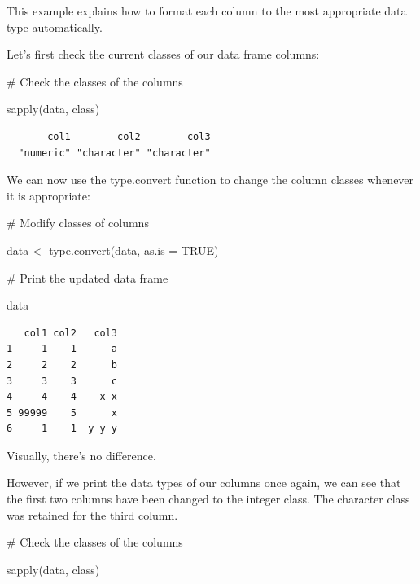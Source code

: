 \documentclass[
  letterpaper,
  DIV=11,
  numbers=noendperiod]{scrreprt}
\newenvironment{Shaded}{\begin{snugshade}}{\end{snugshade}}
\newcommand{\AttributeTok}[1]{\textcolor[rgb]{0.40,0.45,0.13}{#1}}
\newcommand{\CommentTok}[1]{\textcolor[rgb]{0.37,0.37,0.37}{#1}}
\newcommand{\ConstantTok}[1]{\textcolor[rgb]{0.56,0.35,0.01}{#1}}
\newcommand{\FunctionTok}[1]{\textcolor[rgb]{0.28,0.35,0.67}{#1}}
\newcommand{\NormalTok}[1]{\textcolor[rgb]{0.00,0.23,0.31}{#1}}
\newcommand{\OtherTok}[1]{\textcolor[rgb]{0.00,0.23,0.31}{#1}}
\begin{document}
This example explains how to format each column to the most appropriate
data type automatically.

Let's first check the current classes of our data frame columns:

\begin{Shaded}
\begin{Highlighting}[]
\CommentTok{\# Check the classes of the columns}

\FunctionTok{sapply}\NormalTok{(data, class)}
\end{Highlighting}
\end{Shaded}

\begin{verbatim}
       col1        col2        col3 
  "numeric" "character" "character" 
\end{verbatim}

We can now use the type.convert function to change the column classes
whenever it is appropriate:

\begin{Shaded}
\begin{Highlighting}[]
\CommentTok{\# Modify classes of columns}

\NormalTok{data }\OtherTok{\textless{}{-}} \FunctionTok{type.convert}\NormalTok{(data, }\AttributeTok{as.is =} \ConstantTok{TRUE}\NormalTok{)}

\CommentTok{\# Print the updated data frame}

\NormalTok{data}
\end{Highlighting}
\end{Shaded}

\begin{verbatim}
   col1 col2   col3
1     1    1      a
2     2    2      b
3     3    3      c
4     4    4    x x
5 99999    5      x
6     1    1  y y y
\end{verbatim}

Visually, there's no difference.

However, if we print the data types of our columns once again, we can
see that the first two columns have been changed to the integer class.
The character class was retained for the third column.

\begin{Shaded}
\begin{Highlighting}[]
\CommentTok{\# Check the classes of the columns}

\FunctionTok{sapply}\NormalTok{(data, class)}
\end{Highlighting}
\end{Shaded}
\end{document}
